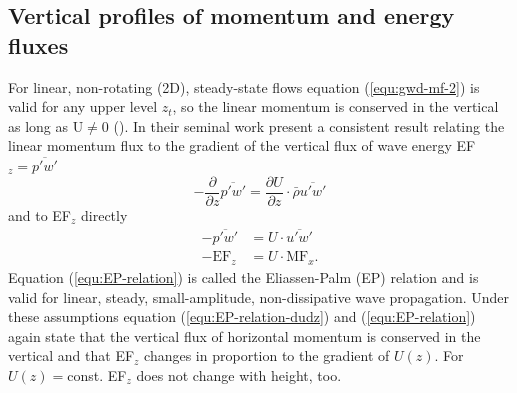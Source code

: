 \subsection*{Vertical profiles of momentum and energy fluxes}
For linear, non-rotating (2D), steady-state flows equation (\ref{equ:gwd-mf-2}) is valid for any upper level $z_t$, so the linear momentum is conserved in the vertical as long as U$\neq 0$ (\cite[]{durran_lee_2003}). In their seminal work \textcite[]{eliassen_transfer_1960} present a consistent result relating the linear momentum flux to the gradient of the vertical flux of wave energy EF$_z = \overbar{p'w'}$
\begin{equation}
    -\frac{\partial}{\partial z}\overbar{p'w'} = \frac{\partial U}{\partial z} \cdot \bar{\rho} \overbar{u'w'}
    \label{equ:EP-relation-dudz}
\end{equation}
and to EF$_z$ directly
\begin{equation}
    \begin{aligned}
    -\overbar{p'w'}& = U \cdot \overbar{u'w'} \\
    -\mathrm{EF}_z& = U \cdot \mathrm{MF}_x.
    \end{aligned}
    \label{equ:EP-relation}
\end{equation}
Equation (\ref{equ:EP-relation}) is called the Eliassen-Palm (EP) relation and is valid for linear, steady, small-amplitude, non-dissipative wave propagation. Under these assumptions equation (\ref{equ:EP-relation-dudz}) and (\ref{equ:EP-relation}) again state that the vertical flux of horizontal momentum is conserved in the vertical and that EF$_z$ changes in proportion to the gradient of $U(z)$. For $U(z)=$const. EF$_z$ does not change with height, too.

